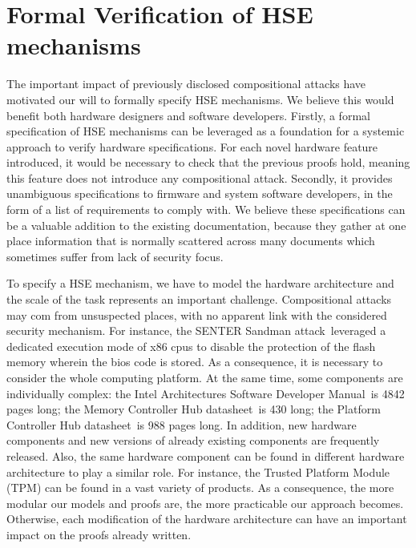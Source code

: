 \section{Formal Verification of HSE mechanisms}
\label{sec:intro:verif}

The important impact of previously disclosed compositional attacks have
motivated our will to formally specify HSE mechanisms.
%
We believe this would benefit both hardware designers and software developers.
%
Firstly, a formal specification of HSE mechanisms can be leveraged as a
foundation for a systemic approach to verify hardware specifications.
%
For each novel hardware feature introduced, it would be necessary to check that
the previous proofs hold, meaning this feature does not introduce any
compositional attack.
%
Secondly, it provides unambiguous specifications to firmware and system software
developers, in the form of a list of requirements to comply with.
%
We believe these specifications can be a valuable addition to the existing
documentation, because they gather at one place information that is normally
scattered across many documents which sometimes suffer from lack of security
focus.

To specify a HSE mechanism, we have to model the hardware architecture and the
scale of the task represents an important challenge.
%
Compositional attacks may com from unsuspected places, with no apparent link
with the considered security mechanism.
%
For instance, the SENTER Sandman attack\,\cite{kovah2015senter} leveraged a
dedicated execution mode of x86 \acp{cpu} to disable the protection of the flash
memory wherein the \ac{bios} code is stored.
%
As a consequence, it is necessary to consider the whole computing platform.
%
At the same time, some components are individually complex:
%
the Intel Architectures Software Developer Manual\,\cite{intel2014manual} is
4842 pages long;
%
the Memory Controller Hub datasheet\,\cite{intel2009mch} is 430 long;
%
the Platform Controller Hub datasheet\,\cite{intel2012pch} is 988 pages long.
%
In addition, new hardware components and new versions of already existing
components are frequently released.
%
Also, the same
hardware component can be found in different hardware architecture to play a
similar role.
%
For instance, the Trusted Platform Module (TPM) can be found in a vast variety
of products.
%
As a consequence, the more modular our models and proofs are, the more
practicable our approach becomes.
%
Otherwise, each modification of the hardware architecture can have an important
impact on the proofs already written.

